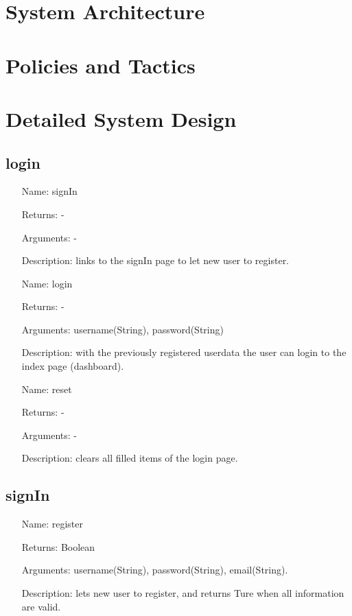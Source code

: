\documentclass[runningheads]{llncs}
\begin{document}
\section{System Architecture}
\section{Policies and Tactics}
\section{Detailed System Design}
\subsection{login}
\begin{itemize}
	\item[Name:] signIn
	\item[Returns:] -
	\item[Arguments:] -
	\item[Description:] links to the signIn page to let new user to register.
\end{itemize}

\begin{itemize}
	\item[Name:] login
	\item[Returns:] -
	\item[Arguments:] username(String), password(String)
	\item[Description:] with the previously registered userdata the user can login to the index page (dashboard).
\end{itemize}

\begin{itemize}
	\item[Name:] reset
	\item[Returns:] -
	\item[Arguments:] -
	\item[Description:] clears all filled items of the login page.
\end{itemize}

\subsection{signIn}
\begin{itemize}
	\item[Name:] register
	\item[Returns:] Boolean
	\item[Arguments:] username(String), password(String), email(String).
	\item[Description:] lets new user to register, and returns Ture when all information are valid.
\end{itemize}
\end{document}
